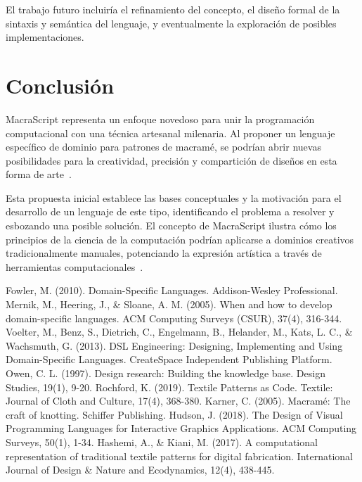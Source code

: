 \documentclass[conference]{IEEEtran}
\begin{document}
El trabajo futuro incluiría el refinamiento del concepto, el diseño formal de la sintaxis y semántica del lenguaje, y eventualmente la exploración de posibles implementaciones.

\section{Conclusión}
MacraScript representa un enfoque novedoso para unir la programación computacional con una técnica artesanal milenaria. Al proponer un lenguaje específico de dominio para patrones de macramé, se podrían abrir nuevas posibilidades para la creatividad, precisión y compartición de diseños en esta forma de arte~\cite{rochford2019}.

Esta propuesta inicial establece las bases conceptuales y la motivación para el desarrollo de un lenguaje de este tipo, identificando el problema a resolver y esbozando una posible solución. El concepto de MacraScript ilustra cómo los principios de la ciencia de la computación podrían aplicarse a dominios creativos tradicionalmente manuales, potenciando la expresión artística a través de herramientas computacionales~\cite{owen1997}.

\begin{thebibliography}{00}
 Fowler, M. (2010). Domain-Specific Languages. Addison-Wesley Professional.
 Mernik, M., Heering, J., \& Sloane, A. M. (2005). When and how to develop domain-specific languages. ACM Computing Surveys (CSUR), 37(4), 316-344.
 Voelter, M., Benz, S., Dietrich, C., Engelmann, B., Helander, M., Kats, L. C., \& Wachsmuth, G. (2013). DSL Engineering: Designing, Implementing and Using Domain-Specific Languages. CreateSpace Independent Publishing Platform.
 Owen, C. L. (1997). Design research: Building the knowledge base. Design Studies, 19(1), 9-20.
 Rochford, K. (2019). Textile Patterns as Code. Textile: Journal of Cloth and Culture, 17(4), 368-380.
 Karner, C. (2005). Macramé: The craft of knotting. Schiffer Publishing.
 Hudson, J. (2018). The Design of Visual Programming Languages for Interactive Graphics Applications. ACM Computing Surveys, 50(1), 1-34.
 Hashemi, A., \& Kiani, M. (2017). A computational representation of traditional textile patterns for digital fabrication. International Journal of Design \& Nature and Ecodynamics, 12(4), 438-445.
\end{thebibliography}
\end{document}
